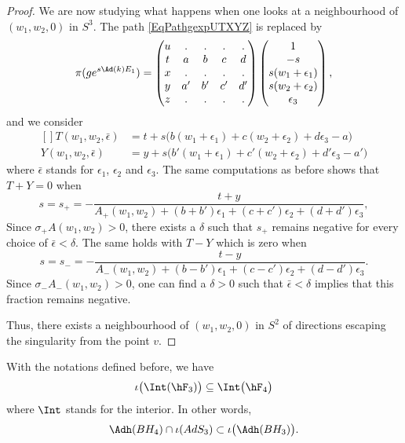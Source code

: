 \begin{proof}
We are now studying what happens when one looks at a neighbourhood of $(w_1,w_2,0)$ in $S^3$. The path \eqref{EqPathgexpUTXYZ} is replaced by
\begin{equation}
	\pi(g e^{s\Ad(k)E_1})=
	\begin{pmatrix}
 u	&	.	&	.	&	.	&	.\\
 t	&	a	&	b	&	c	&	d\\
 x	&	.	&	.	&	.	&	.\\
 y	&	a'	&	b'	&	c'	&	d'\\
z	&	.	&	.	&	.	&	.
 \end{pmatrix}
\begin{pmatrix}
	1	\\
	-s	\\
	s(w_1+\epsilon_1)	\\
	s(w_2+\epsilon_2)	\\
	\epsilon_3
\end{pmatrix},
\end{equation}
and we consider
\begin{equation}
	\begin{aligned}[]
		T(w_1,w_2,\bar\epsilon)&=t+s\big( b(w_1+\epsilon_1)+c(w_2+\epsilon_2)+d\epsilon_3-a \big)\\
		Y(w_1,w_2,\bar\epsilon)&=y+s\big( b'(w_1+\epsilon_1)+c'(w_2+\epsilon_2)+d'\epsilon_3-a' \big)
	\end{aligned}
\end{equation}
where $\bar\epsilon$ stands for $\epsilon_1$, $\epsilon_2$ and $\epsilon_3$. The same computations as before shows that $T+Y=0$ when
\begin{equation}
	s=s_+=-\frac{ t+y }{ A_+(w_1,w_2)+(b+b')\epsilon_1+(c+c')\epsilon_2+(d+d')\epsilon_3 },
\end{equation}
Since $\sigma_+A(w_1,w_2)>0$, there exists a $\delta$ such that $s_+$ remains negative for every choice of $\bar\epsilon<\delta$. The same holds with $T-Y$ which is zero when
\begin{equation}
	s=s_-=-\frac{ t-y }{ A_-(w_1,w_2)+(b-b')\epsilon_1+(c-c')\epsilon_2 +(d-d')\epsilon_3 }.
\end{equation}
Since $\sigma_-A_-(w_1,w_2)>0$, one can find a $\delta>0$ such that $\bar\epsilon<\delta$ implies that this fraction remains negative.

Thus, there exists a neighbourhood of $(w_1,w_2,0)$ in $S^2$ of directions escaping the singularity from the point $v$.
\end{proof}

\begin{lemma}		\label{LemIntTroisQueatr}
	With the notations defined before, we have
	\begin{equation}
		\iota\big( \Int(\hF_3) \big)\subseteq \Int\big( \hF_4 \big)
	\end{equation}
	where $\Int$ stands for the interior. In other words,
	\begin{equation}
		\Adh(BH_4)\cap\iota(AdS_3)\subset\iota\big( \Adh(BH_3) \big).
	\end{equation}
\end{lemma}


